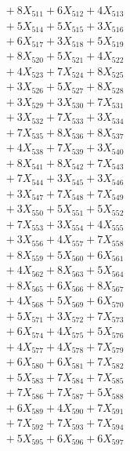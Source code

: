 \documentclass[a4paper,10pt]{article}
\begin{document}
{\begin{align}
&\;  + 8 X_{511} + 6 X_{512} + 4 X_{513} \\[0.3ex]
&\;  + 5 X_{514} + 5 X_{515} + 3 X_{516} \\[0.3ex]
&\;  + 6 X_{517} + 3 X_{518} + 5 X_{519} \\[0.5ex]\allowbreak
&\;  + 8 X_{520} + 5 X_{521} + 4 X_{522} \\[0.3ex]
&\;  + 4 X_{523} + 7 X_{524} + 8 X_{525} \\[0.3ex]
&\;  + 3 X_{526} + 5 X_{527} + 8 X_{528} \\[0.3ex]
&\;  + 3 X_{529} + 3 X_{530} + 7 X_{531} \\[0.3ex]
&\;  + 3 X_{532} + 7 X_{533} + 3 X_{534} \\[0.3ex]
&\;  + 7 X_{535} + 8 X_{536} + 8 X_{537} \\[0.3ex]
&\;  + 4 X_{538} + 7 X_{539} + 3 X_{540} \\[0.3ex]
&\;  + 8 X_{541} + 8 X_{542} + 7 X_{543} \\[0.3ex]
&\;  + 7 X_{544} + 3 X_{545} + 3 X_{546} \\[0.3ex]
&\;  + 3 X_{547} + 7 X_{548} + 7 X_{549} \\[0.5ex]\allowbreak
&\;  + 3 X_{550} + 5 X_{551} + 5 X_{552} \\[0.3ex]
&\;  + 7 X_{553} + 3 X_{554} + 4 X_{555} \\[0.3ex]
&\;  + 3 X_{556} + 4 X_{557} + 7 X_{558} \\[0.3ex]
&\;  + 8 X_{559} + 5 X_{560} + 6 X_{561} \\[0.3ex]
&\;  + 4 X_{562} + 8 X_{563} + 5 X_{564} \\[0.3ex]
&\;  + 8 X_{565} + 6 X_{566} + 8 X_{567} \\[0.3ex]
&\;  + 4 X_{568} + 5 X_{569} + 6 X_{570} \\[0.3ex]
&\;  + 5 X_{571} + 3 X_{572} + 7 X_{573} \\[0.3ex]
&\;  + 6 X_{574} + 4 X_{575} + 5 X_{576} \\[0.3ex]
&\;  + 4 X_{577} + 4 X_{578} + 7 X_{579} \\[0.5ex]\allowbreak
&\;  + 6 X_{580} + 6 X_{581} + 7 X_{582} \\[0.3ex]
&\;  + 5 X_{583} + 7 X_{584} + 7 X_{585} \\[0.3ex]
&\;  + 7 X_{586} + 7 X_{587} + 5 X_{588} \\[0.3ex]
&\;  + 6 X_{589} + 4 X_{590} + 7 X_{591} \\[0.3ex]
&\;  + 7 X_{592} + 7 X_{593} + 7 X_{594} \\[0.3ex]
&\;  + 5 X_{595} + 6 X_{596} + 6 X_{597} \\[0.3ex]

\end{align}}
\end{document}
